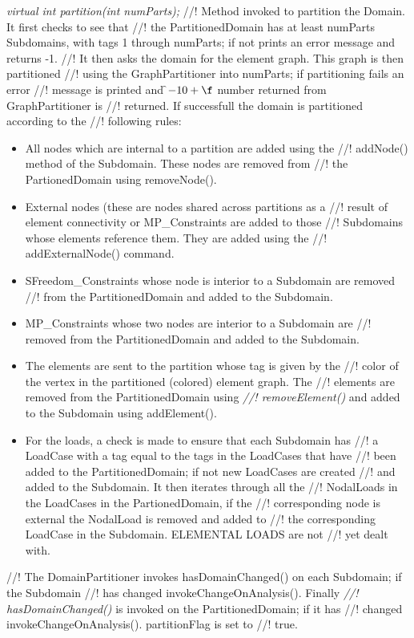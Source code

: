 {\em virtual int partition(int numParts);}
//! Method invoked to partition the Domain. It first checks to see that
//! the PartitionedDomain has at least \p numParts Subdomains, with tags
1 through \p numParts; if not prints an error message and returns -1. 
//! It then asks the domain for the element graph. This graph is then partitioned 
//! using the GraphPartitioner into \p numParts; if partitioning fails an error 
//! message is printed and  \f$-10 +\f$ number returned from GraphPartitioner is
//! returned. If successfull the domain is partitioned according to the
//! following rules: \begin{itemize}
\item All nodes which are internal to a partition are added using the
//! addNode() method of the Subdomain. These nodes are removed from
//! the PartionedDomain using removeNode(). 
\item External nodes (these are nodes shared across partitions as a
//! result of element connectivity or MP\_Constraints are added to those
//! Subdomains whose elements reference them. They are added using the
//! addExternalNode() command. 
\item SFreedom\_Constraints whose node is interior to a Subdomain are removed
//! from the PartitionedDomain and added to the Subdomain. 
\item MP\_Constraints whose two nodes are interior to a Subdomain are
//! removed from the PartitionedDomain and added to the Subdomain.
\item The elements are sent to the partition whose tag is given by the
//! color of the vertex in the partitioned (colored) element graph. The
//! elements are removed from the PartitionedDomain using {\em
//! removeElement()} and added to the Subdomain using addElement().
\item For the loads, a check is made to ensure that each Subdomain has
//! a LoadCase with a tag equal to the tags in the LoadCases that have
//! been added to the PartitionedDomain; if not new LoadCases are created
//! and added to the Subdomain. It then iterates through all the
//! NodalLoads in the LoadCases in the PartionedDomain, if the
//! corresponding node is external the NodalLoad is removed and added to
//! the corresponding LoadCase in the Subdomain. ELEMENTAL LOADS are not
//! yet dealt with. 
\end{itemize}

//! The DomainPartitioner invokes hasDomainChanged() on each Subdomain; if the Subdomain 
//! has changed invokeChangeOnAnalysis(). Finally {\em
//! hasDomainChanged()} is invoked on the PartitionedDomain; if it has
//! changed invokeChangeOnAnalysis(). \p partitionFlag is set to
//! true. 


